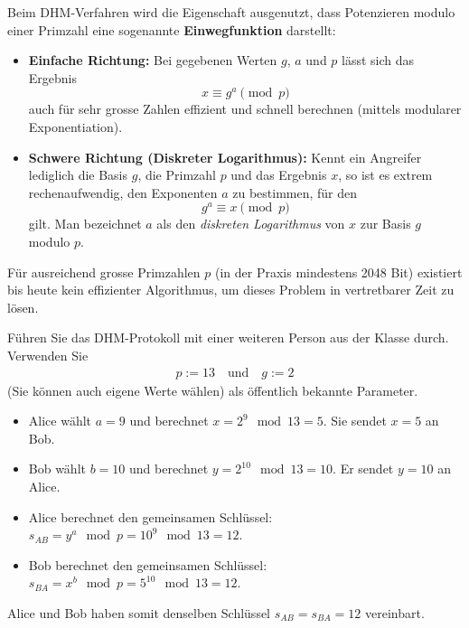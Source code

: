 \begin{myremark}\label{rem:dislog}
	Beim \gls{DHM}-Verfahren wird die Eigenschaft ausgenutzt, dass Potenzieren modulo einer Primzahl eine sogenannte \textbf{Einwegfunktion} darstellt:
	\begin{itemize}
		\item \textbf{Einfache Richtung:} Bei gegebenen Werten $g$, $a$ und $p$ lässt sich das Ergebnis
		      \[
			      x \equiv g^a \pmod p
		      \]
		      auch für sehr grosse Zahlen effizient und schnell berechnen (mittels modularer Exponentiation).
		\item \textbf{Schwere Richtung (Diskreter Logarithmus):} Kennt ein Angreifer lediglich die Basis $g$, die Primzahl $p$ und das Ergebnis $x$, so ist es extrem rechenaufwendig, den Exponenten $a$ zu bestimmen, für den
		      \[
			      g^a \equiv x \pmod p
		      \]
		      gilt. Man bezeichnet $a$ als den \emph{diskreten Logarithmus} von $x$ zur Basis $g$ modulo $p$.
	\end{itemize}
	Für ausreichend grosse Primzahlen $p$ (in der Praxis mindestens 2048 Bit) existiert bis heute kein effizienter Algorithmus, um dieses Problem in vertretbarer Zeit zu lösen.
\end{myremark}

\begin{myexercise}
	Führen Sie das \gls{DHM}-Protokoll mit einer weiteren Person aus der Klasse durch. Verwenden Sie
	\begin{align*}
		p := 13 \quad \text{und}\quad g := 2
	\end{align*}
	(Sie können auch eigene Werte wählen) als öffentlich bekannte Parameter.
	\begin{myanswer}
		\begin{itemize}
			\item Alice wählt $a = 9$ und berechnet $x = 2^9 \mod 13 = 5$. Sie sendet $x = 5$ an Bob.
			\item Bob wählt $b = 10$ und berechnet $y = 2^{10} \mod 13 = 10$. Er sendet $y = 10$ an Alice.
			\item Alice berechnet den gemeinsamen Schlüssel: $s_{AB} = y^a \mod p = 10^9 \mod 13 = 12$.
			\item Bob berechnet den gemeinsamen Schlüssel: $s_{BA} = x^b \mod p = 5^{10} \mod 13 = 12$.
		\end{itemize}
		Alice und Bob haben somit denselben Schlüssel $s_{AB} = s_{BA} = 12$ vereinbart.
	\end{myanswer}
\end{myexercise}

